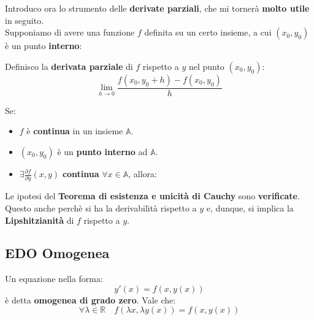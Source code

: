 \documentclass[a4paper, oneside]{article}
\newcommand\R{\mathbb{R}}
\newcommand\A{\mathbb{A}}
\newcommand\de{\partial}
\def\potatoshape{
  (1,0) (2,1.5) (1.6,3) (0.3,2.7) (-0.4,1.2)
}
\newcommand{\potato}[3][draw=white]{
  \begin{scope}[shift={#2}, scale=#3]
    \draw[#1]
      plot [smooth cycle, tension=1]
      coordinates {\potatoshape};
  \end{scope}
}
\begin{document}
    \noindent
    Introduco ora lo strumento delle \textbf{derivate parziali}, che mi tornerà \textbf{molto utile} in seguito. \\
    Supponiamo di avere una funzione $f$ definita su un certo insieme, a cui $(x_0,y_0)$ è un punto \textbf{interno}:
    \begin{center}
    \end{center}
    \begin{definition}
        Definisco la \textbf{derivata parziale} di $f$ rispetto a $y$ nel punto $(x_0,y_0)$:
        \[\lim_{h\to 0} \frac{f(x_0,y_0+h) - f(x_0,y_0)}{h}\]
    \end{definition}
    \newpage
    \begin{proposition}
        Se:
        \begin{itemize}
            \item $f$ è \textbf{continua} in un insieme $\A$.
            \item $(x_0,y_0)$ è un \textbf{punto interno} ad $\A$. 
            \item $\exists \frac{\de f}{\de y} (x,y)$ \textbf{continua} $\forall x\in\A$, allora:
        \end{itemize}
        Le ipotesi del \textbf{Teorema di esistenza e unicità di Cauchy} sono \textbf{verificate}.\\
        Questo anche perchè si ha la derivabilità rispetto a $y$ e, dunque, si implica la \textbf{Lipshitzianità} di $f$ rispetto a $y$.
    \end{proposition}

    \subsection{EDO Omogenea}
    Un equazione nella forma:
    \[y'(x) = f\left(x,y(x)\right)\]
    è detta \textbf{omogenea di grado zero}. Vale che:
    \[\forall\lambda\in\R \quad f\left(\lambda x,\lambda y(x)\right)=f\left(x,y(x)\right)\]
\end{document}
